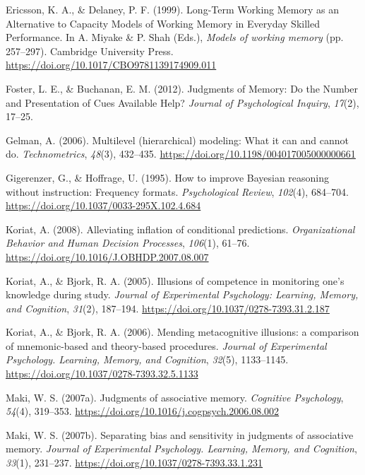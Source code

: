 \documentclass[
  man,floatsintext]{apa7}
\newlength{\cslhangindent}
\newenvironment{CSLReferences}[2] %
 {\begin{list}{}{%
  \setlength{\itemindent}{0pt}
  \setlength{\leftmargin}{0pt}
  \setlength{\parsep}{0pt}
  \ifodd #1
   \setlength{\leftmargin}{\cslhangindent}
   \setlength{\itemindent}{-1\cslhangindent}
  \fi
  \setlength{\itemsep}{#2\baselineskip}}}
 {\end{list}}
\begin{document}
\begin{CSLReferences}{1}{0}
Ericsson, K. A., \& Delaney, P. F. (1999). {Long-Term Working Memory as an Alternative to Capacity Models of Working Memory in Everyday Skilled Performance}. In A. Miyake \& P. Shah (Eds.), \emph{Models of working memory} (pp. 257--297). Cambridge University Press. \url{https://doi.org/10.1017/CBO9781139174909.011}

Foster, L. E., \& Buchanan, E. M. (2012). {Judgments of Memory: Do the Number and Presentation of Cues Available Help?} \emph{Journal of Psychological Inquiry}, \emph{17}(2), 17--25.

Gelman, A. (2006). Multilevel (hierarchical) modeling: What it can and cannot do. \emph{Technometrics}, \emph{48}(3), 432--435. \url{https://doi.org/10.1198/004017005000000661}

Gigerenzer, G., \& Hoffrage, U. (1995). How to improve Bayesian reasoning without instruction: Frequency formats. \emph{Psychological Review}, \emph{102}(4), 684--704. \url{https://doi.org/10.1037/0033-295X.102.4.684}

Koriat, A. (2008). {Alleviating inflation of conditional predictions}. \emph{Organizational Behavior and Human Decision Processes}, \emph{106}(1), 61--76. \url{https://doi.org/10.1016/J.OBHDP.2007.08.007}

Koriat, A., \& Bjork, R. A. (2005). {Illusions of competence in monitoring one's knowledge during study.} \emph{Journal of Experimental Psychology: Learning, Memory, and Cognition}, \emph{31}(2), 187--194. \url{https://doi.org/10.1037/0278-7393.31.2.187}

Koriat, A., \& Bjork, R. A. (2006). {Mending metacognitive illusions: a comparison of mnemonic-based and theory-based procedures.} \emph{Journal of Experimental Psychology. Learning, Memory, and Cognition}, \emph{32}(5), 1133--1145. \url{https://doi.org/10.1037/0278-7393.32.5.1133}

Maki, W. S. (2007a). {Judgments of associative memory}. \emph{Cognitive Psychology}, \emph{54}(4), 319--353. \url{https://doi.org/10.1016/j.cogpsych.2006.08.002}

Maki, W. S. (2007b). {Separating bias and sensitivity in judgments of associative memory.} \emph{Journal of Experimental Psychology. Learning, Memory, and Cognition}, \emph{33}(1), 231--237. \url{https://doi.org/10.1037/0278-7393.33.1.231}


\end{CSLReferences}
\end{document}
